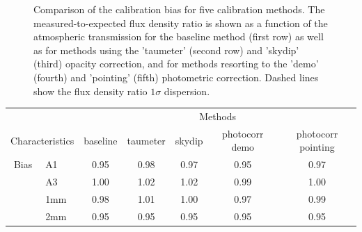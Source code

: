 \begin{figure}[ht!]
\begin{center}
    \vspace{-0.3cm}
    \caption[Calibration bias comparison]{\small{Comparison of the
      calibration bias for five calibration methods. The measured-to-expected flux density ratio is shown as a
      function of the atmospheric transmission for the baseline method
      (first row) as well as for methods using the 'taumeter' (second
      row) and 'skydip' (third) opacity correction, and for methods
      resorting to the 'demo' (fourth) and 'pointing' (fifth)
      photometric correction. Dashed lines
      show the flux density ratio $1 \sigma $ dispersion.}}
    \label{fig:mwc349_obstau_others}
  \end{center}
\end{figure}


\begin{table}[th]
\begin{center}
\begin{tabular}{|c|l|c|c|c|c|c|}
  \hline
  \multicolumn{2}{|c|}{}  &  \multicolumn{5}{|c|}{Methods} \\\cline{3-7}
  \multicolumn{2}{|c|}{Characteristics} &  baseline  & taumeter  &  skydip  &  photocorr demo & photocorr pointing \\
  \hline\hline
  Bias &  A1            &   0.95   &  0.98    &  0.97    &   0.95    &  0.97  \\
       &  A3            &   1.00   &  1.02    &  1.02    &   0.99    &  1.00  \\
       &  1mm           &   0.98   &  1.01    &  1.00    &   0.97    &  0.99  \\
       &  2mm           &   0.95   &  0.95    &  0.95    &   0.95    &  0.95  \\

\end{tabular}
\end{center}
\end{table}

